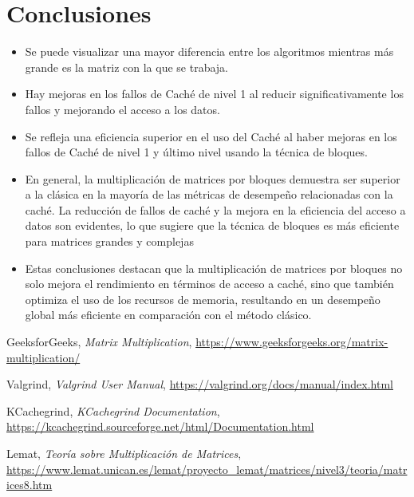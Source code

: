 \documentclass[paper=a4, fontsize=11pt]{scrartcl}
\numberwithin{equation}{section}		%
\numberwithin{figure}{section}			%
\numberwithin{table}{section}				%
\begin{document}
\section{Conclusiones}
\begin{itemize}
    \item Se puede visualizar una mayor diferencia entre los algoritmos mientras más grande es la matriz con la que se trabaja.
    \item Hay mejoras en los fallos de Caché de nivel 1 al reducir significativamente los fallos y mejorando el acceso a los datos.
    \item Se refleja una eficiencia superior en el uso del Caché al haber mejoras en los fallos de Caché de nivel 1 y último nivel usando la técnica de bloques.
    \item En general, la multiplicación de matrices por bloques demuestra ser superior a la clásica en la mayoría de las métricas de desempeño relacionadas con la caché. La reducción de fallos de caché y la mejora en la eficiencia del acceso a datos son evidentes, lo que sugiere que la técnica de bloques es más eficiente para matrices grandes y complejas
    \item Estas conclusiones destacan que la multiplicación de matrices por bloques no solo mejora el rendimiento en términos de acceso a caché, sino que también optimiza el uso de los recursos de memoria, resultando en un desempeño global más eficiente en comparación con el método clásico.
\end{itemize}

\begin{thebibliography}{9}

    GeeksforGeeks,
    \textit{Matrix Multiplication},
    \href{https://www.geeksforgeeks.org/matrix-multiplication/}{https://www.geeksforgeeks.org/matrix-multiplication/}

    Valgrind,
    \textit{Valgrind User Manual},
    \href{https://valgrind.org/docs/manual/index.html}{https://valgrind.org/docs/manual/index.html}

    KCachegrind,
    \textit{KCachegrind Documentation},
    \href{https://kcachegrind.sourceforge.net/html/Documentation.html}{https://kcachegrind.sourceforge.net/html/Documentation.html}

    Lemat,
    \textit{Teoría sobre Multiplicación de Matrices},
    \href{https://www.lemat.unican.es/lemat/proyecto_lemat/matrices/nivel3/teoria/matrices8.htm}{https://www.lemat.unican.es/lemat/proyecto_lemat/matrices/nivel3/teoria/matrices8.htm}
\end{thebibliography}
\end{document}
